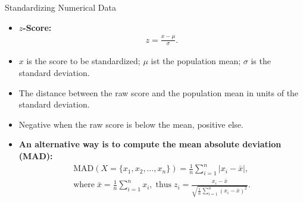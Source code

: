 \begin{frame}{Standardizing Numerical Data}
	\begin{itemize}
		\item \textbf{$z$-Score:}
		      \begin{align*}
			      z = \frac{x-\mu}{\sigma}.
		      \end{align*}
		\item $x$ is the score to be standardized; $\mu$ ist the population mean; $\sigma$ is the standard deviation.
		\item The distance between the raw score and the population mean in units of the standard deviation.
		\item Negative when the raw score is below the mean, positive else.
		\item \textbf{An alternative way is to compute the mean absolute deviation (MAD):}
		      \begin{align*}
			      \text{MAD}(X = \{x_1,x_2,\ldots,x_n\}) = \frac{1}{n} \sum_{i=1}^{n} \vert x_i - \bar{x} \vert, \\
			      \text{where} \; \bar{x} = \frac{1}{n} \sum_{i=1}^{n}x_i, \; \text{thus} \; z_i = \frac{x_i-\bar{x}}{\sqrt{\frac{1}{n}\sum_{i=1}^{n}(x_i-\bar{x})^2}}.
		      \end{align*}
	\end{itemize}
\end{frame}

